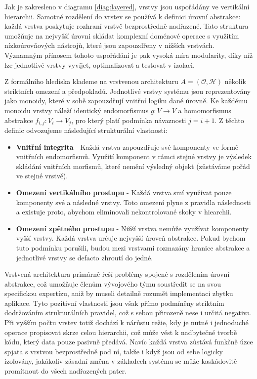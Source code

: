 \documentclass[FM,DP,fonts]{tulthesis}
\begin{document}
Jak je zakresleno v diagramu \ref{diag:layered}, vrstvy jsou uspořádány ve vertikální hierarchii. Samotné rozdělení do vrstev se používá k definici úrovní abstrakce: každá vrstva poskytuje rozhraní vrstvě bezprostředně nadřazené. Tato struktura umožňuje na nejvyšší úrovni skládat komplexní doménové operace s využitím nízkoúrovňových nástrojů, které jsou zapouzdřeny v nižších vrstvách. Významným přínosem tohoto uspořádání je pak vysoká míra modularity, díky níž lze jednotlivé vrstvy vyvíjet, optimalizovat a testovat v izolaci. \parencite{khan-software-architectures}

Z formálního hlediska klademe na vrstvenou architekturu $A = (\mathcal{O}, \mathcal{H})$ několik striktních omezení a předpokladů. Jednotlivé vrstvy systému jsou reprezentovány jako monoidy, které v sobě zapouzdřují vnitřní logiku dané úrovně. Ke každému monoidu vrstvy náleží identický endomorfismus $g: V \to V$ a homomorfismus abstrakce $f_{i,j}: V_i \to V_j$, pro který platí podmínka návaznosti $j = i + 1$. Z těchto definic odvozujeme následující strukturální vlastnosti:

\begin{itemize}
	\item \textbf{Vnitřní integrita} - Každá vrstva zapouzdřuje své komponenty ve formě vnitřních endomorfismů. Využití komponent v rámci stejné vrstvy je výsledek skládání vnitřních morfismů, které nemění výsledný objekt (zůstáváme pořád ve stejné vrstvě).
	\item \textbf{Omezení vertikálního prostupu} - Každá vrstva smí využívat pouze komponenty své a následné vrstvy. Toto omezení plyne z pravidla následnosti a existuje proto, abychom eliminovali nekontrolované skoky v hiearchii.
	\item \textbf{Omezení zpětného prostupu} - Nižší vrstva nemůže využívat komponenty vyšší vrstvy. Každá vrstva určuje nejvyšší úroveň abstrakce. Pokud bychom tuto podmínku porušili, budou mezi vrstvami rozmazány hranice abstrakce a jednotlivé vrstvy se defacto zhroutí do jedné.
\end{itemize}

Vrstvená architektura primárně řeší problémy spojené s rozdělením úrovní abstrakce, což umožňuje členům vývojového týmu soustředit se na svou specifickou expertízu, aniž by museli detailně rozumět implementaci zbytku aplikace. Tyto pozitivní vlastnosti jsou však přímo podmíněny striktním dodržováním strukturálních pravidel, což s sebou přirozeně nese i určitá negativa. Při vyšším počtu vrstev totiž dochází k nárůstu režie, kdy je nutné i jednoduché operace propisovat skrze celou hierarchii, což může vést k nadbytečné tvorbě kódu, který data pouze pasivně předává. Navíc každá vrstva zůstává funkčně úzce spjata s vrstvou bezprostředně pod ní, takže i když jsou od sebe logicky izolovány, jakákoliv zásadní změna v základech systému se může kaskádovitě promítnout do všech nadřazených pater. \parencite{khan-software-architectures}
\end{document}
